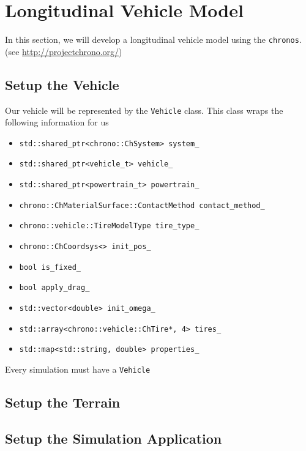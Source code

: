 \section{Longitudinal Vehicle Model}
\label{longitudinal_vehicle_model}

In this section, we will develop a longitudinal vehicle model using the  \lstinline{chronos}.
(see \url{http://projectchrono.org/})



\subsection{Setup the Vehicle}

Our vehicle will be represented by the \lstinline{Vehicle} class. This class wraps the following information for us

\begin{itemize}
\item \lstinline{std::shared_ptr<chrono::ChSystem> system_}
\item \lstinline{std::shared_ptr<vehicle_t> vehicle_}
\item \lstinline{std::shared_ptr<powertrain_t> powertrain_}
\item \lstinline{chrono::ChMaterialSurface::ContactMethod contact_method_}
\item \lstinline{chrono::vehicle::TireModelType tire_type_}
\item \lstinline{chrono::ChCoordsys<> init_pos_}
\item \lstinline{bool is_fixed_}
\item \lstinline{bool apply_drag_}
\item \lstinline{std::vector<double> init_omega_}
\item \lstinline{std::array<chrono::vehicle::ChTire*, 4> tires_}
\item \lstinline{std::map<std::string, double> properties_}
\end{itemize}


Every simulation must have a \lstinline{Vehicle}


\subsection{Setup the Terrain}


\subsection{Setup the Simulation Application}


